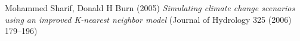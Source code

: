 \documentclass[a4paper,11pt, oneside]{article}   %
\begin{document}


\tableofcontents
\newpage

%











%

\begin{thebibliography}{9}
	Mohammed Sharif, Donald H Burn (2005)
	\emph{Simulating climate change scenarios using an improved
	K-nearest neighbor model}
	(Journal of Hydrology 325 (2006) 179–196)
\end{thebibliography}
\end{document}

